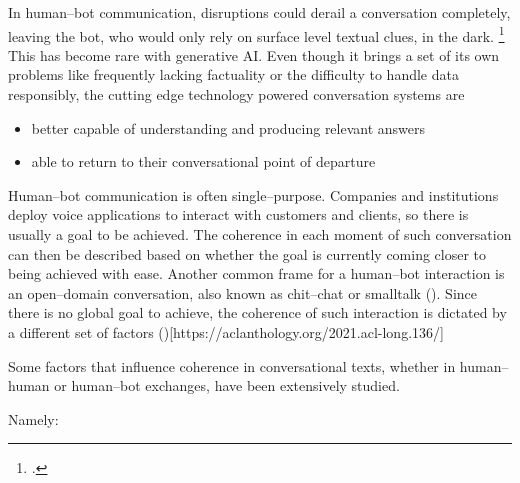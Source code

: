 \documentclass[12pt]{report}
\begin{document}
\par
In human–bot communication, disruptions could derail a conversation completely,
leaving the bot, who would only rely on surface level textual clues, in the dark. \footcite{mctear2020conversational}
This has become rare with generative AI.
Even though it brings a set of its own problems like
frequently lacking factuality or
the difficulty to handle data responsibly,
the cutting edge technology powered conversation systems are

\begin{itemize}
\item
   better capable of understanding and producing relevant answers

\item
   able to return to their conversational point of departure
\end{itemize}

\par
Human–bot communication is often single–purpose.
Companies and institutions deploy voice applications to interact with customers and clients,
so there is usually a goal to be achieved.
The coherence in each moment of such conversation can then be described based on whether
the goal is currently coming closer to being achieved with ease.
Another common frame for a human–bot interaction is an open–domain conversation,
also known as chit–chat or smalltalk ().
Since there is no global goal to achieve,
the coherence of such interaction is dictated by
a different set of factors ()[https://aclanthology.org/2021.acl-long.136/]

\par
Some factors that influence coherence in conversational texts,
whether in human–human or human–bot exchanges,
have been extensively studied.
\par
Namely:
\end{document}
